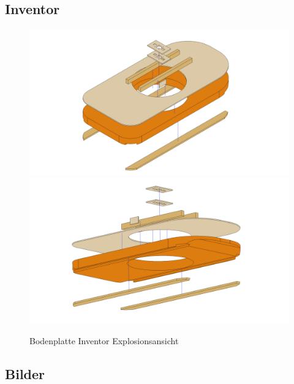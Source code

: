 \subsection{Inventor}
\begin{figure}[H]
    \centering
    \includegraphics[width=\textwidth]{../../../../Inventor/Bodenplatte/png/Bodenplatte_Praesentation_Hauptansicht.png}
    \includegraphics[width=\textwidth]{../../../../Inventor/Bodenplatte/png/Bodenplatte_Praesentation_SeitlichUnten.png}
    \label{fig:konst:bodenplatte:inventor}
    \caption{Bodenplatte Inventor Explosionsansicht}
\end{figure}
\clearpage

\begin{landscape}
    \clearpage


    \clearpage

\end{landscape}


\cleardoublepage
\subsection{Bilder}


